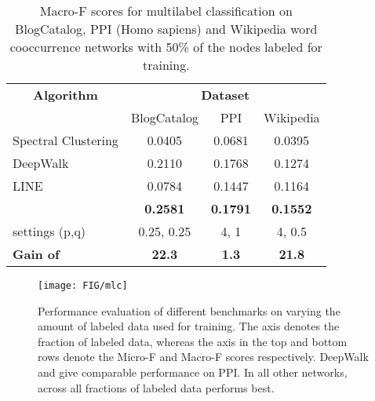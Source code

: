 \begin{table}[t]
	\centering
	
	\begin{tabular}{l|c|c|c}
	\multicolumn{1}{c}{\textbf{Algorithm}} & \multicolumn{3}{c}{\textbf{Dataset}}      \\ 
										   & BlogCatalog     & PPI             & Wikipedia   \\ \hline
	Spectral Clustering					   & 0.0405			 & 0.0681	 	   & 0.0395		\\
	DeepWalk                               & 0.2110		     & 0.1768          & 0.1274 \\
	LINE                                   & 0.0784          & 0.1447          & 0.1164    \\
	\nodevec 			                   & \textbf{0.2581} & \textbf{0.1791} & \textbf{0.1552}     \\ \hline
	\nodevec settings (p,q)		  		   & 0.25, 0.25  	 & 4, 1	       		& 4, 0.5		\\
	{\bf Gain of \nodevec [\%]}         	& {\bf 22.3}	 & {\bf 1.3}       & {\bf 21.8 }
	\end{tabular}
	\vspace{-0.2cm}
	\caption{Macro-F scores for multilabel classification on BlogCatalog, PPI (Homo sapiens) and Wikipedia word cooccurrence networks with 50\% of the nodes labeled for
	training.}
\label{tab:mlc_macro}
\vspace{-0.4cm}
\end{table}

\begin{figure*}[t]
\centering
	\texttt{[image: FIG/mlc]}
	\vspace{-0.3cm}
	\caption{Performance evaluation of different benchmarks on varying the amount of labeled data used for training. The  axis denotes the fraction of labeled data, whereas the  axis in the top and bottom rows denote the Micro-F and Macro-F scores respectively. DeepWalk and \nodevec give comparable performance on PPI. In all other networks, across all fractions of labeled data \nodevec performs best.}\label{fig:mlc}
\vspace{-0.4cm}
\end{figure*}


